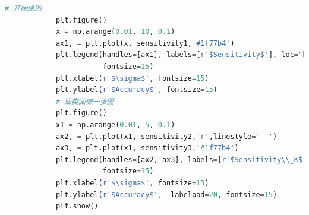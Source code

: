 \documentclass[withoutpreface,bwprint]{cumcmthesis}
\begin{document}
\begin{appendices}
\begin{lstlisting}[language=Python]
			# 开始绘图
			plt.figure()
			x = np.arange(0.01, 10, 0.1)
			ax1, = plt.plot(x, sensitivity1,'#1f77b4')
			plt.legend(handles=[ax1], labels=[r'$Sensitivity$'], loc="best",
					   fontsize=15)
			plt.xlabel(r'$\sigma$', fontsize=15)
			plt.ylabel(r'$Accuracy$', fontsize=15)
			# 亚类画做一张图
			plt.figure()
			x1 = np.arange(0.01, 5, 0.1)
			ax2, = plt.plot(x1, sensitivity2,'r',linestyle='--')
			ax3, = plt.plot(x1, sensitivity3,'#1f77b4')
			plt.legend(handles=[ax2, ax3], labels=[r'$Sensitivity\\_K$', r'$Sensitivity\\_Pb$'], loc="best",
					   fontsize=15)
			plt.xlabel(r'$\sigma$', fontsize=15)
			plt.ylabel(r'$Accuracy$',  labelpad=20, fontsize=15)
			plt.show()
			
		\end{lstlisting}

\end{appendices}
	
\end{document}
